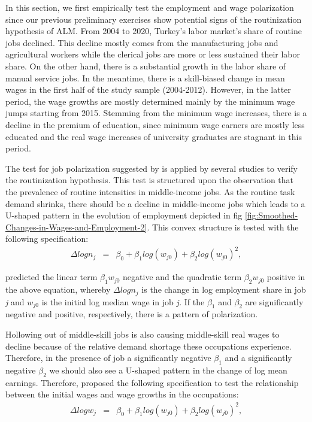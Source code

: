 \begin{onehalfspace}
In this section, we first empirically test the employment and wage
polarization since our previous preliminary exercises show potential
signs of the routinization hypothesis of ALM. From 2004 to 2020, Turkey's
labor market's share of routine jobs declined. This decline mostly
comes from the manufacturing jobs and agricultural workers while the
clerical jobs are more or less sustained their labor share. On the
other hand, there is a substantial growth in the labor share of manual
service jobs. In the meantime, there is a skill-biased change in mean
wages in the first half of the study sample (2004-2012). However,
in the latter period, the wage growths are mostly determined mainly
by the minimum wage jumps starting from 2015. Stemming from the minimum
wage increases, there is a decline in the premium of education, since
minimum wage earners are mostly less educated and the real wage increases
of university graduates are stagnant in this period.

The test for job polarization suggested by \citet{2007Goos} is applied
by several studies \citep{2013AKCOMAK,2018Sebastian,Marouani2020}
to verify the routinization hypothesis. This test is structured upon
the observation that the prevalence of routine intensities in middle-income
jobs. As the routine task demand shrinks, there should be a decline
in middle-income jobs which leads to a U-shaped pattern in the evolution
of employment depicted in fig \ref{fig:Smoothed-Changes-in-Wages-and-Employment-2}.
This convex structure is tested with the following specification:
\begin{eqnarray}
\Delta logn_{j} & = & \beta_{0}+\beta_{1}log(w_{j0})+\beta_{2}log(w_{j0})^{2},\label{eq:polarization(GM, 2007)}
\end{eqnarray}

\citet{2007Goos} predicted the linear term $\beta_{1}w_{j0}$ negative
and the quadratic term $\beta_{2}w_{j0}$ positive in the above equation,
whereby $\Delta logn_{j}$ is the change in log employment share in
job \emph{j }and $w_{j0}$ is the initial log median wage in job \emph{j.
}If the $\beta_{1}$ and $\beta_{2}$ are significantly negative and
positive, respectively, there is a pattern of polarization.

Hollowing out of middle-skill jobs is also causing middle-skill real
wages to decline because of the relative demand shortage these occupations
experience. Therefore, in the presence of job a significantly negative
$\beta_{1}$ and a significantly negative $\beta_{2}$ we should also
see a U-shaped pattern in the change of log mean earnings. Therefore,
\citet{2018Sebastian} proposed the following specification to test
the relationship between the initial wages and wage growths in the
occupations:
\begin{eqnarray}
\Delta logw_{j} & = & \beta_{0}+\beta_{1}log(w_{j0})+\beta_{2}log(w_{j0})^{2},\label{eq:sebastian}
\end{eqnarray}


\end{onehalfspace}
